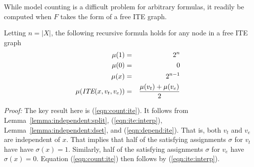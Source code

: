 \documentclass{llncs}
\newcommand{\tautology}{1}
\newcommand{\nil}{0}
\newcommand{\ite}{\mbox{\it ITE}}
\newcommand{\interp}{\sigma}
\newcommand{\mcount}{\mu}
\begin{document}
While model counting is a difficult problem for arbitrary
formulas, it readily be computed when $F$ takes the form of a free
ITE graph.

\begin{theorem}
\label{theorem:count}
Letting $n = |X|$, the following recursive formula holds for any node in a free ITE graph
\begin{eqnarray}
\mcount(\tautology) & = & 2^{n} \label{eqn:count:true}\\
\mcount(\nil) & = & 0 \label{eqn:count:false}\\
\mcount(x) & = & 2^{n-1} \label{eqn:count:variable}\\
\mcount(\ite(x, v_t, v_e)) & = & \frac{\mcount(v_t) + \mcount(v_e)}{2} \label{eqn:count:ite}
\end{eqnarray}  
\end{theorem}
\noindent
{\em Proof:} The key result here is (\ref{eqn:count:ite}).  It follows
from Lemma~\ref{lemma:independent:split}, (\ref{eqn:ite:interp}),
Lemma~\ref{lemma:independent:dset}, and (\ref{eqn:depend:ite}).  That is, both
$v_t$ and $v_e$ are independent of $x$.  That implies that half of the
satisfying assignments $\interp$ for $v_t$ have have $\interp(x) =
\tautology$.  Similarly, half of the satisfying assignments $\interp$
for $v_e$ have $\interp(x) = \nil$.  Equation (\ref{eqn:count:ite}) then follows by (\ref{eqn:ite:interp}).


\end{document}
